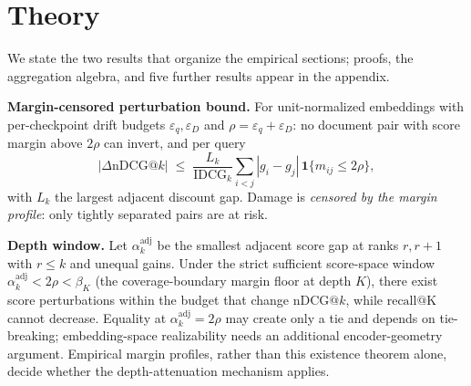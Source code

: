 \documentclass[sigconf,anonymous,review]{acmart}
\makeatletter
\newcommand{\rc}[1]{\mathrm{recall@#1}}
\makeatother
\begin{document}
\section{Theory}\label{sec:theory}
We state the two results that organize the empirical sections; proofs, the aggregation algebra, and five further results appear in the appendix.

\textbf{Margin-censored perturbation bound.} For unit-normalized embeddings with per-checkpoint drift budgets $\varepsilon_q,\varepsilon_D$ and $\rho=\varepsilon_q+\varepsilon_D$: no document pair with score margin above $2\rho$ can invert, and per query
\[ |\Delta\mathrm{nDCG@}k| \;\le\; \frac{L_k}{\mathrm{IDCG}_k}\sum_{i<j}|g_i-g_j|\,\mathbf{1}\{m_{ij}\le 2\rho\}, \]
with $L_k$ the largest adjacent discount gap. Damage is \emph{censored by the margin profile}: only tightly separated pairs are at risk.

\textbf{Depth window.} Let $\alpha_k^{\mathrm{adj}}$ be the smallest adjacent score gap at ranks $r,r{+}1$ with $r\le k$ and unequal gains. Under the strict sufficient score-space window $\alpha_k^{\mathrm{adj}} < 2\rho < \beta_K$ (the coverage-boundary margin floor at depth $K$), there exist score perturbations within the budget that change $\mathrm{nDCG@}k$, while $\rc{K}$ cannot decrease. Equality at $\alpha_k^{\mathrm{adj}}=2\rho$ may create only a tie and depends on tie-breaking; embedding-space realizability needs an additional encoder-geometry argument. Empirical margin profiles, rather than this existence theorem alone, decide whether the depth-attenuation mechanism applies.
\end{document}
